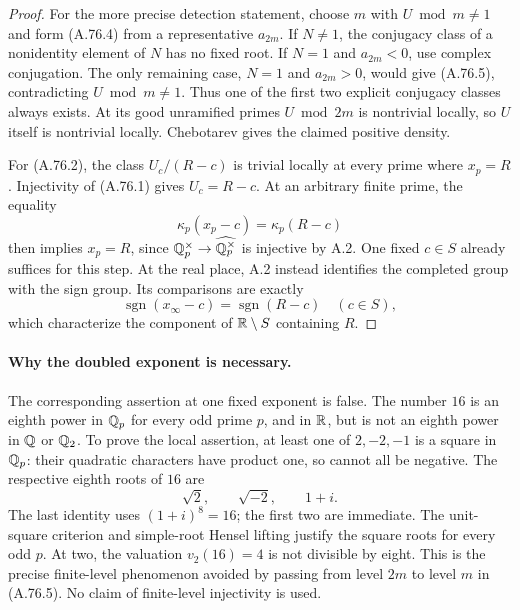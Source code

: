\begin{proof}
For the more precise detection statement, choose $m$ with
$U\bmod m\ne1$ and form (A.76.4) from a representative
$a_{2m}$.  If $N\ne1$, the conjugacy class of a nonidentity
element of $N$ has no fixed root.  If $N=1$ and $a_{2m}<0$,
use complex conjugation.  The only remaining case,
$N=1$ and $a_{2m}>0$, would give (A.76.5), contradicting
$U\bmod m\ne1$.  Thus one of the first two explicit
conjugacy classes always exists.  At its good unramified
primes $U\bmod2m$ is nontrivial locally, so $U$ itself is
nontrivial locally.  Chebotarev gives the claimed positive
density.

For (A.76.2), the class $U_c/(R-c)$ is trivial locally at
every prime where $x_p=R$.  Injectivity of (A.76.1) gives
$U_c=R-c$.  At an arbitrary finite prime, the equality
\[
                     \kappa_p(x_p-c)=\kappa_p(R-c)
       \tag{A.76.6}
\]
then implies $x_p=R$, since
$\mathbb Q_p^\times\to\widehat{\mathbb Q_p^\times}$ is injective by A.2.
One fixed $c\in S$ already suffices for this step.
At the real place, A.2 instead identifies the completed
group with the sign group.  Its comparisons are exactly
\[
            \operatorname{sgn}(x_\infty-c)
                     =\operatorname{sgn}(R-c)\quad(c\in S),
       \tag{A.76.7}
\]
which characterize the component of $\mathbb R\setminus S$
containing $R$.
\end{proof}

\paragraph{Why the doubled exponent is necessary.}
The corresponding assertion at one fixed exponent is false.
The number $16$ is an eighth power in $\mathbb Q_p$ for every odd
prime $p$, and in $\mathbb R$, but is not an eighth power in
$\mathbb Q$ or $\mathbb Q_2$.  To prove the local assertion, at least
one of $2,-2,-1$ is a square in $\mathbb Q_p$: their quadratic
characters have product one, so cannot all be negative.
The respective eighth roots of $16$ are
\[
                       \sqrt2,\qquad\sqrt{-2},\qquad1+i.
       \tag{A.76.8}
\]
The last identity uses $(1+i)^8=16$; the first two are
immediate.  The unit-square criterion and simple-root
Hensel lifting justify the square roots for every odd $p$.
At two, the valuation $v_2(16)=4$ is not divisible by eight.
This is the precise finite-level phenomenon avoided by
passing from level $2m$ to level $m$ in (A.76.5).
No claim of finite-level injectivity is used.

